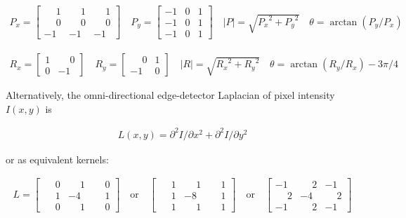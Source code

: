 \documentclass{bmcart}
\begin{document}
\begin{ceqn}
\begin{align}
  P_x = \begin{bmatrix}
         \phantom{-}1 & \phantom{-}1 & \phantom{-}1  \\
         \phantom{-}0 & \phantom{-}0 & \phantom{-}0 \\
        -1 & -1 & -1
      \end{bmatrix}
      \quad
  P_y = \begin{bmatrix}
        -1 & 0 & 1  \\
        -1 & 0 & 1 \\
        -1 & 0 & 1
      \end{bmatrix}
            \quad
  |P|=\sqrt{{P_x}^2+{P_y}^2}
  \quad
  \theta=\arctan{(P_y/P_x)}
\end{align}
\end{ceqn}
\begin{ceqn}
\begin{align}
  R_x = \begin{bmatrix}
        1 & \phantom{-}0  \\
        0 & -1
      \end{bmatrix}
      \quad
  R_y = \begin{bmatrix}
        \phantom{-}0 & 1 \\
        -1 & 0
      \end{bmatrix}
      \quad
  |R|=\sqrt{{R_x}^2+{R_y}^2}
  \quad
  \theta=\arctan{(R_y/R_x)}-3\pi/4
\end{align}
\end{ceqn}
Alternatively, the omni-directional edge-detector Laplacian of pixel intensity $I(x,y)$ is 
\begin{ceqn}
\begin{align}
    L(x,y)={\partial^2 I}/{\partial x^2} + {\partial^2 I}/{\partial y^2}
\end{align}
\end{ceqn}
or as equivalent kernels:
\begin{ceqn}
\begin{align}
  L = \begin{bmatrix}
         \phantom{-}0 & \phantom{-}1 & \phantom{-}0  \\
         \phantom{-}1 & -4 & \phantom{-}1 \\
         \phantom{-}0 & \phantom{-}1 & \phantom{-}0 
      \end{bmatrix}
      \quad
      \mathrm{or}
      \quad
   \begin{bmatrix}
         \phantom{-}1 & \phantom{-}1 & \phantom{-}1  \\
         \phantom{-}1 & -8 & \phantom{-}1 \\
         \phantom{-}1 & \phantom{-}1 & \phantom{-}1
    \end{bmatrix}
      \quad
      \mathrm{or}
      \quad
   \begin{bmatrix}
         -1 & \phantom{-}2 & -1  \\
         \phantom{-}2 & -4 & \phantom{-}2 \\
         -1 & \phantom{-}2 & -1 
    \end{bmatrix}
\end{align}
\end{ceqn}
\end{document}

